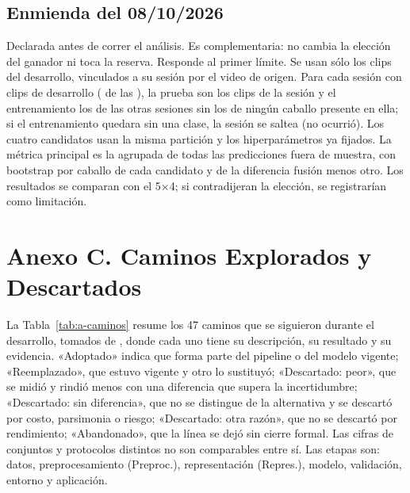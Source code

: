 \subsection{Enmienda del 08/10/2026}
Declarada antes de correr el análisis. Es complementaria: no cambia la elección del ganador ni toca la reserva. Responde al primer límite. Se usan sólo los \ClipsDesarrollo{} clips del desarrollo, vinculados a su sesión por el video de origen. Para cada sesión con clips de desarrollo (\SesionesEvaluadas{} de las \SesionesTotal{}), la prueba son los clips de la sesión y el entrenamiento los de las otras sesiones sin los de ningún caballo presente en ella; si el entrenamiento quedara sin una clase, la sesión se saltea (no ocurrió). Los cuatro candidatos usan la misma partición y los hiperparámetros ya fijados. La métrica principal es la \fmacro{} agrupada de todas las predicciones fuera de muestra, con bootstrap por caballo de cada candidato y de la diferencia fusión menos otro. Los resultados se comparan con el 5$\times$4; si contradijeran la elección, se registrarían como limitación.

\section{Anexo C. Caminos Explorados y Descartados}
La Tabla~\ref{tab:a-caminos} resume los 47 caminos que se siguieron durante el desarrollo, tomados de , donde cada uno tiene su descripción, su resultado y su evidencia. «Adoptado» indica que forma parte del pipeline o del modelo vigente; «Reemplazado», que estuvo vigente y otro lo sustituyó; «Descartado: peor», que se midió y rindió menos con una diferencia que supera la incertidumbre; «Descartado: sin diferencia», que no se distingue de la alternativa y se descartó por costo, parsimonia o riesgo; «Descartado: otra razón», que no se descartó por rendimiento; «Abandonado», que la línea se dejó sin cierre formal. Las cifras de conjuntos y protocolos distintos no son comparables entre sí. Las etapas son: datos, preprocesamiento (Preproc.), representación (Repres.), modelo, validación, entorno y aplicación.

